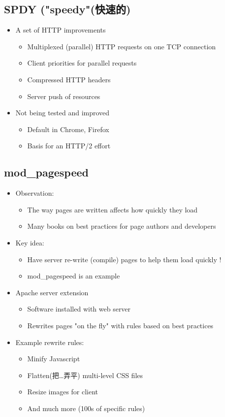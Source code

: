 \documentclass[12pt]{ctexart}   %
\begin{document}
	\subsection{SPDY ("speedy"(快速的)}
	\begin{itemize}
		\item A set of HTTP improvements
		\begin{itemize}
			\item Multiplexed (parallel) HTTP requests on one TCP connection
			\item Client priorities for parallel requests
			\item Compressed HTTP headers
			\item Server push of resources
		\end{itemize}
		
		\item Not being tested and improved
		\begin{itemize}
			\item Default in Chrome, Firefox
			\item Basis for an HTTP/2 effort
		\end{itemize}
	\end{itemize}
	
	\subsection{mod\_pagespeed}
	\begin{itemize}
		\item Observation:
		\begin{itemize}
			\item The way pages are written affects how quickly they load
			\item Many books on best practices for page authors and developers
		\end{itemize}
		
		\item Key idea:
		\begin{itemize}
			\item Have server re-write (compile) pages to help them load quickly !
			\item mod\_pagespeed is an example 
		\end{itemize}
		
		\item Apache server extension
		\begin{itemize}
			\item Software installed with web server
			\item Rewrites pages "on the fly" with rules based on best practices
		\end{itemize}
		
		\item Example rewrite rules:
		\begin{itemize}
			\item Minify Javascript
			\item Flatten(把…弄平) multi-level CSS files
			\item Resize images for client
			\item And much more (100s of specific rules)
		\end{itemize}
	\end{itemize}
	
\end{document}
